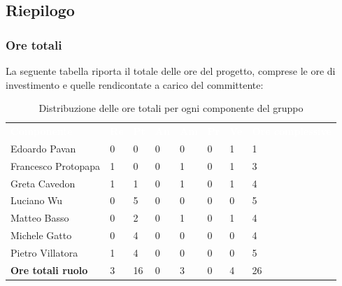 \subsection{Riepilogo}
\subsubsection{Ore totali}
La seguente tabella riporta il totale delle ore del progetto,  comprese le ore di investimento e quelle rendicontate a carico del committente:
\begin{table}[H]
\begin{center}
\renewcommand{\arraystretch}{1.25}
\begin{tabular}{ m{}<{\centering}  m{}<{\centering} m{}<{\centering} m{}<{\centering}  m{}<{\centering}  m{}<{\centering}  m{}<{\centering}  m{}<{\centering}   }
	\rowcolor{darkblue}
	\textcolor{white}{\textbf{Componente}} &\textcolor{white}{\textbf{Re}}&\textcolor{white}{\textbf{Pt}}&\textcolor{white}{\textbf{An}}&\textcolor{white}{\textbf{Am}}&\textcolor{white}{\textbf{Pr}}&\textcolor{white}{\textbf{Ve}}&\textcolor{white}{\textbf{Ore complessive}}\\ 
	Edoardo Pavan & 0 & 0 & 0 & 0 & 0 & 1 & 1 \\	
	
	Francesco Protopapa & 1 & 0 & 0 & 1 & 0 & 1 & 3 \\

	Greta Cavedon & 1 & 1 & 0 & 1 & 0 & 1 & 4 \\
	
	Luciano Wu & 0 & 5 & 0 & 0 & 0 & 0 &5 \\
	
	Matteo Basso & 0 & 2 & 0 & 1 & 0 & 1 & 4 \\
	
	Michele Gatto & 0 & 4 & 0 & 0 & 0 & 0 & 4 \\
	
	Pietro Villatora & 1 & 4 & 0 & 0 & 0 & 0 & 5 \\
	
	\textbf{Ore totali ruolo} & 3 & 16 & 0 & 3 & 0 & 4 & 26 \\

\end{tabular}
\caption{Distribuzione delle ore totali per ogni componente del gruppo}
\end{center}
\end{table}

